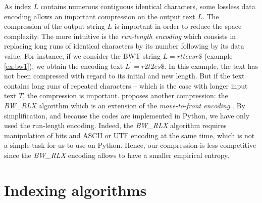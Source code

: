 \documentclass[11pt,twoside]{article}
\theoremstyle{definition}
\begin{document}
As index $L$ contains numerous contiguous identical characters, some lossless data encoding allows an important compression on the output text $L$. The compression of the output string $L$ is important in order to reduce the space complexity. The more intuitive is the \textit{run-length encoding} which consists in replacing long runs of identical characters by its number following by its data value. For instance, if we consider the BWT string $L = rtteesr\$$ (example \ref{ex:bw1}), we obtain the encoding text $L^{\prime} = r2t2es\$$. In this example, the text has not been compressed with regard to its initial and new length. But if the text contains long runs of repeated characters -- which is the case with longer input text $T$, the compression is important. \citet{Ferragina-2005} proposes another compression: the \textit{BW\_RLX} algorithm which is an extension of the \textit{move-to-front encoding} \citep{Bentley-1986}. By simplification, and because the codes are implemented in Python, we have only used the run-length encoding. Indeed, the \textit{BW\_RLX} algorithm requires manipulation of bits and ASCII or UTF encoding at the same time, which is not a simple task for us to use on Python. Hence, our compression is less competitive since the \textit{BW\_RLX} encoding allows to have a smaller empirical entropy.

\section{Indexing algorithms}\label{sec:algorithms}
\end{document}
